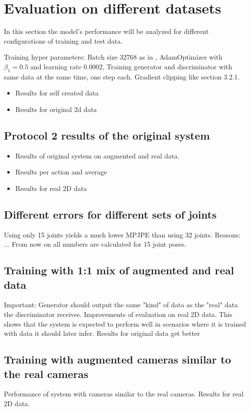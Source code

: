 \section{Evaluation on different datasets}
\label{sec:evaluation}


In this section the model's performance will be analyzed for different configurations of training and test data.

Training hyper parameters:
Batch size 32768 as in \cite{drover18}, AdamOptimizer with $\beta_1 = 0.5$ and learning rate $0.0002$, Training generator and discriminator with same data at the same time, one step each. Gradient clipping like \citet{chorowski14} section 3.2.1.


\begin{itemize}
	\item Results for self created data
	\item Results for original 2d data
\end{itemize}

\subsection{Protocol 2 results of the original system}
\begin{itemize}
	\item Results of original system on augmented and real data.
	\item Results per action and average
	\item Results for real 2D data
\end{itemize}


\subsection{Different errors for different sets of joints}
Using only 15 joints yields a much lower MPJPE than using 32 joints. Reasons: ...	
From now on all numbers are calculated for 15 joint poses.

\subsection{Training with 1:1 mix of augmented and real data}
Important: Generator should output the same "kind" of data as the "real" data the discriminator receives.
Improvements of evaluation on real 2D data. 
This shows that the system is expected to perform well in scenarios where it is trained with data it should later infer.
Results for original data get better



\subsection{Training with augmented cameras similar to the real cameras}
Performance of system with cameras similar to the real cameras.
Results for real 2D data.